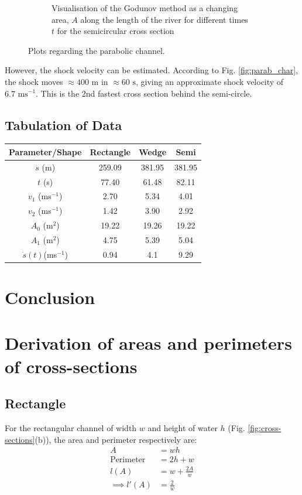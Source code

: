 \documentclass[12pt]{article}
\begin{document}
\begin{figure}[H]
\begin{subfigure}[b]{0.49\textwidth}
        \caption{Visualisation of the Godunov method as a changing area, $A$ along the length of the river for different times $t$ for the semicircular cross section}
        \label{fig:parab_godunov}
    \end{subfigure}
    \caption{Plots regarding the parabolic channel.}
\end{figure}

However, the shock velocity can be estimated. According to Fig. \ref{fig:parab_char}, the shock moves $\approx400\text{ m}$ in $\approx 60 \text{ s}$, giving an approximate shock velocity of $ 6.7\text{ ms}^{-1}$. This is the 2nd fastest cross section behind the semi-circle.

\subsection{Tabulation of Data}
\begin{tabular}{|c|c|c|c|}
    \hline
    Parameter/Shape & Rectangle & Wedge & Semi \\
    \hline
     $s$ (m) & 259.09 & 381.95 & 381.95 \\
     \hline
     $t$ (s) & 77.40 & 61.48 & 82.11 \\
     \hline
     $v_1$ (ms$^{-1}$) & 2.70 & 5.34 & 4.01 \\
     \hline
     $v_2$ (ms$^{-1}$)& 1.42 & 3.90 & 2.92 \\
     \hline
     $A_0$ (m$^{2}$)& 19.22 & 19.26 & 19.22 \\
     \hline
     $A_1$ (m$^{2}$)& 4.75 & 5.39 & 5.04 \\
     \hline
     $\dot{s}(t)$(ms$^{-1}$) & 0.94 & 4.1 & 9.29 \\
     \hline
    
\end{tabular}
\section{Conclusion}
\newpage



\newpage
\appendix
\section{Derivation of areas and perimeters of cross-sections}
\subsection{Rectangle}
\label{appendix:rectangle}
For the rectangular channel of width $w$ and height of water $h$ (Fig. \ref{fig:cross-sections}(b)), the area and perimeter respectively are:
\begin{equation}
    \begin{split}
        A &= wh
        \\\text{Perimeter}&=2h + w
        \\l(A) &= w + \frac{2A}{w}
        \\\implies l'(A) &= \frac{2}{w}
    \end{split}
\end{equation}
\end{document}
